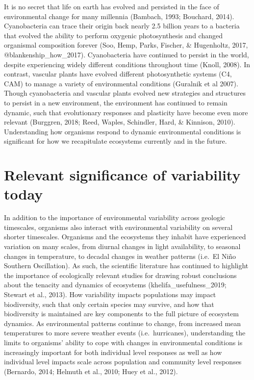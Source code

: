 \documentclass[12pt,twoside]{reedthesis}
\begin{document}
It is no secret that life on earth has evolved and persisted in the face of environmental change for many millennia (Bambach, 1993; Bouchard, 2014). Cyanobacteria can trace their origin back nearly 2.5 billion years to a bacteria that evolved the ability to perform oxygenic photosynthesis and changed organismal composition forever (Soo, Hemp, Parks, Fischer, \& Hugenholtz, 2017, @blankenship\_how\_2017). Cyanobacteria have continued to persist in the world, despite experiencing widely different conditions throughout time (Knoll, 2008). In contrast, vascular plants have evolved different photosynthetic systems (C4, CAM) to manage a variety of environmental conditions (Guralnik et al 2007). Though cyanobacteria and vascular plants evolved new strategies and structures to persist in a new environment, the environment has continued to remain dynamic, such that evolutionary responses and plasticity have become even more relevant (Burggren, 2018; Reed, Waples, Schindler, Hard, \& Kinnison, 2010). Understanding how organisms respond to dynamic environmental conditions is significant for how we recapitulate ecosystems currently and in the future.

\hypertarget{relevant-significance-of-variability-today}{%
\section{Relevant significance of variability today}\label{relevant-significance-of-variability-today}}

In addition to the importance of environmental variability across geologic timescales, organisms also interact with environmental variability on several shorter timescales. Organisms and the ecosystems they inhabit have experienced variation on many scales, from diurnal changes in light availability, to seasonal changes in temperature, to decadal changes in weather patterns (i.e.~El Niño Southern Oscillation). As such, the scientific literature has continued to highlight the importance of ecologically relevant studies for drawing robust conclusions about the tenacity and dynamics of ecosystems (khelifa\_usefulness\_2019; Stewart et al., 2013). How variability impacts populations may impact biodiversity, such that only certain species may survive, and how that biodiversity is maintained are key components to the full picture of ecosystem dynamics. As environmental patterns continue to change, from increased mean temperatures to more severe weather events (i.e.~hurricanes), understanding the limits to organisms' ability to cope with changes in environmental conditions is increasingly important for both individual level responses as well as how individual level impacts scale across population and community level responses (Bernardo, 2014; Helmuth et al., 2010; Huey et al., 2012).
\end{document}
